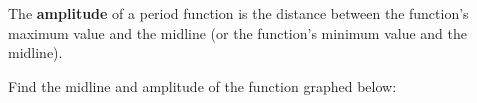 \begin{definition}[Amplitude]
  \label{def:amplitude}

  The \textbf{amplitude} of a period function is the distance between the
  function's maximum value and the midline (or the function's minimum value and
  the midline).
\end{definition}

\begin{exc}
  \label{exc:midline_and_amplitude}

  Find the midline and amplitude of the function graphed below:

  \begin{figure}[H]
    \centering


    \caption{}
    \label{fig:find_the_midline_and_period}
  \end{figure}
\end{exc}

\newpage
